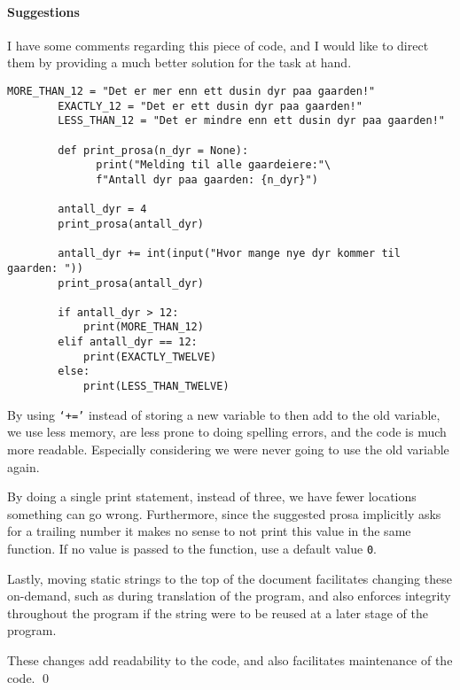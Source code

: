 \documentclass{myassignment}
\begin{document}
\paragraph{Suggestions} I have some comments regarding this piece of code, and I would like to direct them by providing a much better solution for the task at hand.

	\begin{lstlisting}[style=custompython]
		MORE_THAN_12 = "Det er mer enn ett dusin dyr paa gaarden!"
		EXACTLY_12 = "Det er ett dusin dyr paa gaarden!"
		LESS_THAN_12 = "Det er mindre enn ett dusin dyr paa gaarden!"

		def print_prosa(n_dyr = None):
			  print("Melding til alle gaardeiere:"\
			  f"Antall dyr paa gaarden: {n_dyr}")

		antall_dyr = 4
		print_prosa(antall_dyr)

		antall_dyr += int(input("Hvor mange nye dyr kommer til gaarden: "))
		print_prosa(antall_dyr)

		if antall_dyr > 12:
			print(MORE_THAN_12)
		elif antall_dyr == 12:
		 	print(EXACTLY_TWELVE)
		else:
			print(LESS_THAN_TWELVE)
	\end{lstlisting}

By using \texttt{`+='} instead of storing a new variable to then add to the old variable, we use less memory, are less prone to doing spelling errors, and the code is much more readable. Especially considering we were never going to use the old variable again.

By doing a single print statement, instead of three, we have fewer locations something can go wrong. Furthermore, since the suggested prosa implicitly asks for a trailing number it makes no sense to not print this value in the same function. If no value is passed to the function, use a default value \texttt{0}.

Lastly, moving static strings to the top of the document facilitates changing these on-demand, such as during translation of the program, and also enforces integrity throughout the program if the string were to be reused at a later stage of the program.

These changes add readability to the code, and also facilitates maintenance of the code.
\qed
\end{document}
